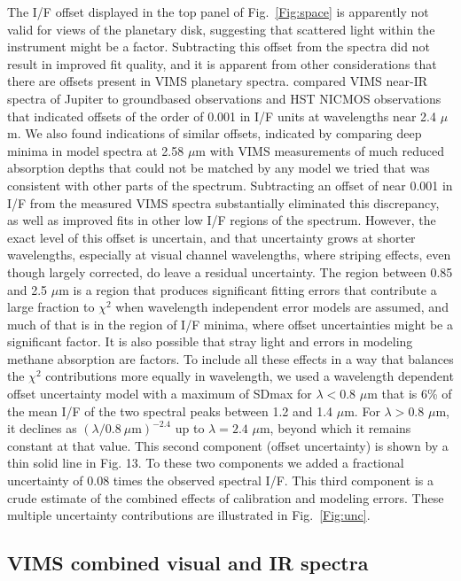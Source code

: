 \documentclass[article,11pt]{emulateapj}
\def\mum{$\mu$m }
\def\mumx{$\mu$m}
\def\chisq{$\chi^2$ }
\begin{document}
The I/F offset displayed in the top panel of Fig.\ \ref{Fig:space} is
apparently not valid for views of the planetary disk, suggesting that
scattered light within the instrument might be a factor.  Subtracting
this offset from the spectra did not result in improved fit quality,
and it is apparent from other considerations that there are offsets
present in VIMS planetary spectra.  \cite{Sro2010vims} compared VIMS
near-IR spectra of Jupiter to groundbased observations and HST NICMOS
observations that indicated offsets of the order of 0.001 in I/F units
at wavelengths near 2.4 \mumx.  We also found indications of similar
offsets, indicated by comparing deep minima in model spectra at 2.58
\mum with VIMS measurements of much reduced absorption depths that
could not be matched by any model we tried that was consistent with
other parts of the spectrum.  Subtracting an offset of near 0.001 in I/F
from the measured VIMS spectra substantially eliminated this
discrepancy, as well as improved fits in other low I/F regions of the
spectrum.  However, the exact level of this offset is uncertain, and
that uncertainty grows at shorter wavelengths, especially at visual channel
wavelengths, where striping effects, even though largely corrected,
do leave a residual uncertainty.  The region between 0.85 and 2.5 \mum
is a region that produces significant fitting errors that contribute
a large fraction to \chisq when wavelength independent error models
are assumed, and much of that is in the region of I/F minima, where
offset uncertainties might be a significant factor.  It is also possible
that stray light  and errors in modeling methane absorption
are factors. To include all these effects in a way that balances the
\chisq contributions more equally in wavelength, we used a
wavelength dependent offset uncertainty model with a maximum of SDmax
for $\lambda < 0.8$ \mum that is 6\% of the mean I/F of the two
spectral peaks between 1.2 and 1.4 \mumx. For  $\lambda > 0.8$ \mumx,
it declines as $(\lambda/0.8\ \mu\mathrm{m})^{-2.4}$ up to 
 $\lambda = 2.4$ \mumx, beyond which it remains constant at that
value. This second component (offset uncertainty) is shown
by a thin solid line in Fig. 13.  To these two components we added a fractional uncertainty
of 0.08 times the observed spectral I/F. This third component
is a crude estimate of the combined effects of calibration and modeling
errors.  These multiple uncertainty contributions
are illustrated in Fig.\ \ref{Fig:unc}.

\subsection{VIMS combined visual and IR spectra}
\end{document}
